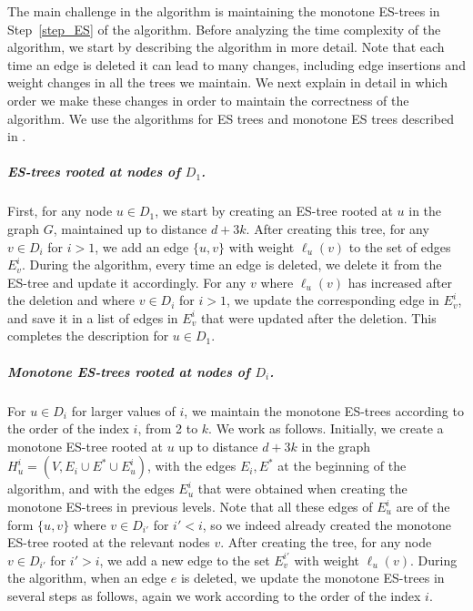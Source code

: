 \documentclass[11pt]{article}
\theoremstyle{definition}
\theoremstyle{remark}
\newcommand{\ytodo}[1]{\todo[color=blue!20]{Y: #1}}
\begin{document}
The main challenge in the algorithm is maintaining the monotone ES-trees in Step~\ref{step_ES} of the algorithm. Before analyzing the time complexity of the algorithm, we start by describing the algorithm in more detail. Note that each time an edge is deleted it can lead to many changes, including edge insertions and weight changes in all the trees we maintain. We next explain in detail in which order we make these changes in order to maintain the correctness of the algorithm. We use the algorithms for ES trees and monotone ES trees described in .

\subparagraph{ES-trees rooted at nodes of $D_1$.} 
First, for any node $u \in D_1$, we start by creating an ES-tree rooted at $u$ in the graph $G$, maintained up to distance $d+3k$. After creating this tree, for any $v \in D_i$ for $i > 1$, we add an edge $\{u,v\}$ with weight $\ell_u(v)$ to the set of edges $E_v^i$. During the algorithm, every time an edge is deleted, we delete it from the ES-tree and update it accordingly. For any $v$ where $\ell_u(v)$ has increased after the deletion and where $v \in D_i$ for $i > 1$, we update the corresponding edge in $E_v^i$, and save it in a list of edges in $E_v^i$ that were updated after the deletion. This completes the description for $u \in D_1$. 
\subparagraph{Monotone ES-trees rooted at nodes of $D_i$.}
For $u \in D_i$ for larger values of $i$, we maintain the monotone ES-trees according to the order of the index $i$, from 2 to $k$. We work as follows. Initially, we create a monotone ES-tree rooted at $u$ up to distance $d+3k$ in the graph $H_u^i=(V,E_i \cup E^* \cup E_u^i)$, with the edges $E_i,E^*$ at the beginning of the algorithm, and with the edges $E_u^i$ that were obtained when creating the monotone ES-trees in previous levels. Note that all these edges of $E_u^i$ are of the form $\{u,v\}$ where $v \in D_{i'}$ for $i' < i$, so we indeed already created the monotone ES-tree rooted at the relevant nodes $v$.  After creating the tree, for any node $v \in D_{i'}$ for $i' > i$, we add a new edge to the set $E_v^{i'}$ with weight $\ell_u(v)$.
During the algorithm, when an edge $e$ is deleted, we update the monotone ES-trees in several steps as follows, again we work according to the order of the index $i$.
\end{document}
